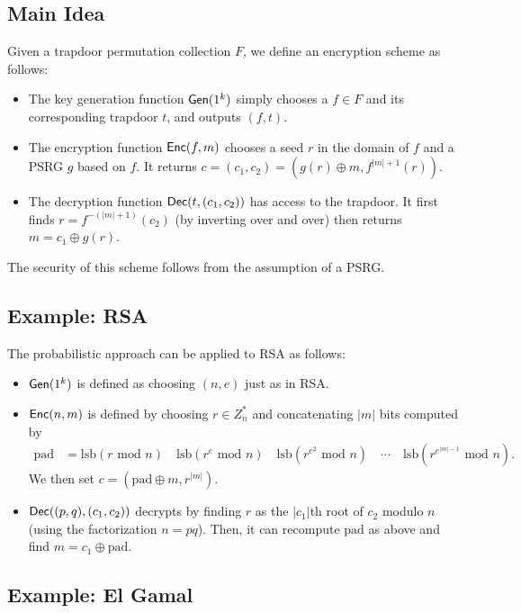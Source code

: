 \documentclass[10pt]{article}
\begin{document}
\subsection{Main Idea}

Given a trapdoor permutation collection $F$, we define an encryption scheme as follows:
\begin{itemize}
	\item The key generation function $\mathsf{Gen}(1^k)$ simply chooses a $f\in F$ and its corresponding trapdoor $t$, and outputs $(f, t)$.
	\item The encryption function $\mathsf{Enc}(f, m)$ chooses a seed $r$ in the domain of $f$ and a PSRG $g$ based on $f$. It returns $c = (c_1, c_2) = (g(r)\oplus m, f^{|m|+1}(r))$.
	\item The decryption function $\mathsf{Dec}(t, (c_1, c_2))$ has access to the trapdoor. It first finds $r = f^{-(|m|+1)}(c_2)$ (by inverting over and over) then returns $m=c_1 \oplus g(r)$.
\end{itemize}
The security of this scheme follows from the assumption of a PSRG.

\subsection{Example: RSA}

The probabilistic approach can be applied to RSA as follows:
\begin{itemize}
	\item $\mathsf{Gen}(1^k)$ is defined as choosing $(n,e)$ just as in RSA.
	\item $\mathsf{Enc}(n,m)$ is defined by choosing $r \in Z_n^{*}$ and concatenating $|m|$ bits computed by
	\begin{align*}
	\text{pad} &= \text{lsb}(r \text{ mod } n) \quad \text{lsb}(r^e \text{ mod } n) \quad  \text{lsb}(r^{e^2} \text{ mod } n) \quad  \cdots \quad  \text{lsb}(r^{e^{|m|-1}} \text{ mod } n).
	\end{align*}
	We then set $c=( \text{pad} \oplus m, r^{|m|})$.
	\item $\mathsf{Dec}((p,q),(c_1, c_2))$ decrypts by finding $r$ as the $|c_1|$th root of $c_2$ modulo $n$ (using the factorization $n=pq$). Then, it can recompute $\text{pad}$ as above and find $m = c_1 \oplus \text{pad}$.
\end{itemize}

\subsection{Example: El Gamal}
\end{document}
